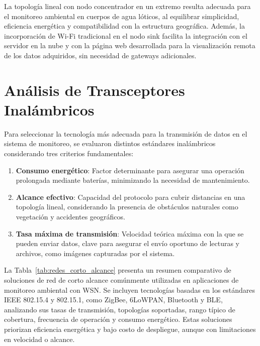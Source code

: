 La topología lineal con nodo concentrador en un extremo resulta adecuada para el monitoreo ambiental en cuerpos de agua lóticos, al equilibrar simplicidad, eficiencia energética y compatibilidad con la estructura geográfica. Además, la incorporación de Wi-Fi tradicional en el nodo sink facilita la integración con el servidor en la nube y con la página web desarrollada para la visualización remota de los datos adquiridos, sin necesidad de gateways adicionales.




\section{Análisis de Transceptores Inalámbricos}
\label{sec:analisis_tecnologias}

Para seleccionar la tecnología más adecuada para la transmisión de datos en el sistema de monitoreo, se evaluaron distintos estándares inalámbricos considerando tres criterios fundamentales:

\begin{enumerate}
    \item \textbf{Consumo energético}: Factor determinante para asegurar una operación prolongada mediante baterías, minimizando la necesidad de mantenimiento.
    \item \textbf{Alcance efectivo}: Capacidad del protocolo para cubrir distancias en una topología lineal, considerando la presencia de obstáculos naturales como vegetación y accidentes geográficos.
    \item \textbf{Tasa máxima de transmisión}: Velocidad teórica máxima con la que se pueden enviar datos, clave para asegurar el envío oportuno de lecturas y archivos, como imágenes capturadas por el sistema.
\end{enumerate}

La Tabla~\ref{tab:redes_corto_alcance} presenta un resumen comparativo de soluciones de red de corto alcance comúnmente utilizadas en aplicaciones de monitoreo ambiental con WSN. Se incluyen tecnologías basadas en los estándares IEEE 802.15.4 y 802.15.1, como ZigBee, 6LoWPAN, Bluetooth y BLE, analizando sus tasas de transmisión, topologías soportadas, rango típico de cobertura, frecuencia de operación y consumo energético. Estas soluciones priorizan eficiencia energética y bajo costo de despliegue, aunque con limitaciones en velocidad o alcance.


